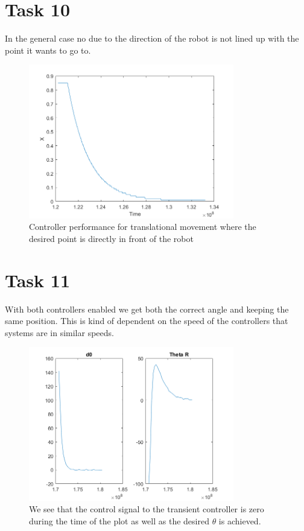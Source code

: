 \documentclass[a4paper,12pt,oneside,onecolumn]{article} %
\begin{document}
\section*{Task 10}
In the general case no due to the direction of the robot is not lined up with the point it wants to go to. 
\begin{figure}[H]
\begin{center}	
  \includegraphics[width = 0.8\textwidth]{task10.png}
  \caption{Controller performance for translational movement where the desired point is directly in front of the robot}
 \end{center}
\end{figure}

\section*{Task 11}
With both controllers enabled we get both the correct angle and keeping the same position. This is kind of dependent on the speed of the controllers that systems are in similar speeds.
\begin{figure}[H]
\begin{center}	
  \includegraphics[width = 0.8\textwidth]{task11.png}
  \caption{We see that the control signal to the transient controller is zero during the time of the plot as well as the desired $\theta$ is achieved.}
 \end{center}
\end{figure}
\end{document}
